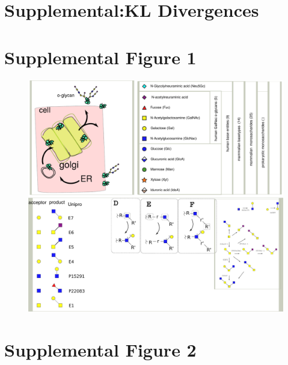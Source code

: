 \documentclass{article}
\begin{document}
\section*{Supplemental:KL Divergences}


\section*{Supplemental Figure 1}

\begin{figure}
\includegraphics[width=\textwidth]{SuppFig_1.pdf}
\end{figure}

\section*{Supplemental Figure 2}
\end{document}
